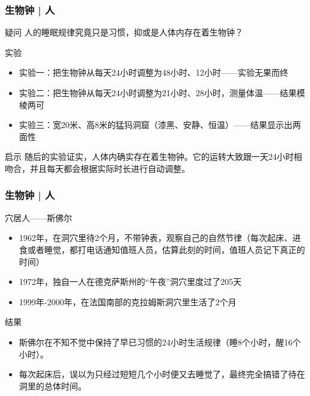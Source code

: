 \begin{frame}
  \frametitle{生物钟 | 人}
  \begin{block}{疑问}
    人的睡眠规律究竟只是习惯，抑或是人体内存在着生物钟？
  \end{block}
  \pause
  \begin{block}{实验}
    \begin{itemize}
      \item 实验一：把生物钟从每天24小时调整为48小时、12小时——实验无果而终
      \item 实验二：把生物钟从每天24小时调整为21小时、28小时，测量体温——结果模棱两可
      \item 实验三：宽20米、高8米的猛犸洞窟（漆黑、安静、恒温）——结果显示出两面性
    \end{itemize}
  \end{block}
  \pause
  \begin{block}{启示}
随后的实验证实，人体内确实存在着生物钟。它的运转大致跟一天24小时相吻合，并且每天都会根据实际时长进行自动调整。
  \end{block}
\end{frame}

\begin{frame}
  \frametitle{生物钟 | 人}
  \begin{block}{穴居人——斯佛尔}
    \begin{itemize}
      \item 1962年，在洞穴里待2个月，不带钟表，观察自己的自然节律（每次起床、进食或者睡觉，都打电话通知值班人员，估算此刻的时间，值班人员记下真正的时间）
      \item 1972年，独自一人在德克萨斯州的“午夜”洞穴里度过了205天
      \item 1999年-2000年，在法国南部的克拉姆斯洞穴里生活了2个月
    \end{itemize}
  \end{block}
  \pause
  \begin{block}{结果}
    \begin{itemize}
      \item 斯佛尔在不知不觉中保持了早已习惯的24小时生活规律（睡8个小时，醒16个小时）。
      \item 每次起床后，误以为只经过短短几个小时便又去睡觉了，最终完全搞错了待在洞里的总体时间。
    \end{itemize}
  \end{block}
\end{frame}

